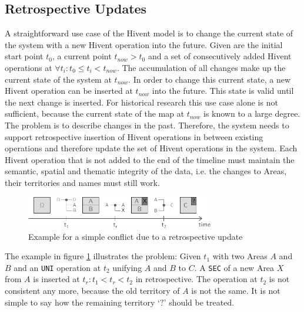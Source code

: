 
\subsection{Retrospective Updates} %
\label{sub:retrospective_updates}

A straightforward use case of the Hivent model is to change the current state of the system with a new Hivent operation into the future. Given are the initial start point $t_0$, a current point $t_{now} > t_0$ and a set of consecutively added Hivent operations at $\forall t_i: t_0 \leq t_i < t_{now}$. The accumulation of all changes make up the current state of the system at $t_{now}$. In order to change this current state, a new Hivent operation can be inserted at $t_{now}$ into the future. This state is valid until the next change is inserted. For historical research this use case alone is not sufficient, because the current state of the map at $t_{now}$ is known to a large degree. The problem is to describe changes in the past. Therefore, the system needs to support retrospective insertion of Hivent operations in between existing operations and therefore update the set of Hivent operations in the system.
Each Hivent operation that is not added to the end of the timeline must maintain the semantic, spatial and thematic integrity of the data, i.e. the changes to Areas, their territories and names must still work.

\begin{figure}[H]
  \vspace{1em}
  \centering
  \includegraphics[width=0.73\textwidth]{graphics/development/editing_hivent_data/retrospective_updates/example}
  \caption{Example for a simple conflict due to a retrospective update}
  \label{fig:update_conflict_example}
\end{figure}

The example in figure \ref{fig:update_conflict_example} illustrates the problem: Given $t_1$ with two Areas $A$ and $B$ and an \texttt{UNI} operation at $t_2$ unifying $A$ and $B$ to $C$. A \texttt{SEC} of a new Area $X$ from $A$ is inserted at $t_r: t_1 < t_r < t_2$ in retrospective. The operation at $t_2$ is not consistent any more, because the old territory of $A$ is not the same. It is not simple to say how the remaining territory `$?$' should be treated.


